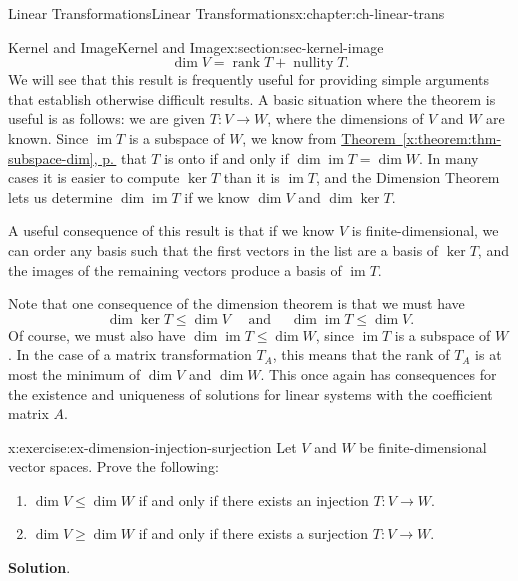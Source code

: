 \documentclass[oneside,10pt,]{book}
\newcommand{\blocktitlefont}{\relax}
\newcommand{\xreffont}{\relax}
\numberwithin{equation}{section}
\newcommand{\im}{\operatorname{im}}
\newcommand{\rank}{\operatorname{rank}}
\begin{document}
\begin{chapterptx}{Linear Transformations}{}{Linear Transformations}{}{}{x:chapter:ch-linear-trans}
\begin{sectionptx}{Kernel and Image}{}{Kernel and Image}{}{}{x:section:sec-kernel-image}
\begin{equation*}
\dim V = \rank T + \operatorname{nullity} T\text{.}
\end{equation*}
We will see that this result is frequently useful for providing simple arguments that establish otherwise difficult results. A basic situation where the theorem is useful is as follows: we are given \(T:V\to W\), where the dimensions of \(V\) and \(W\) are known. Since \(\im T\) is a subspace of \(W\), we know from \hyperref[x:theorem:thm-subspace-dim]{Theorem~{\xreffont\ref{x:theorem:thm-subspace-dim}}, p.\,\pageref{x:theorem:thm-subspace-dim}} that \(T\) is onto if and only if \(\dim \im T = \dim W\). In many cases it is easier to compute \(\ker T\) than it is \(\im T\), and the Dimension Theorem lets us determine \(\dim\im T\) if we know \(\dim V\) and \(\dim \ker T\).%
\par
A useful consequence of this result is that if we know \(V\) is finite-dimensional, we can order any basis such that the first vectors in the list are a basis of \(\ker T\), and the images of the remaining vectors produce a basis of \(\im T\).%
\par
Note that one consequence of the dimension theorem is that we must have%
\begin{equation*}
\dim \ker T\leq \dim V \quad \text{ and } \quad \dim \im T\leq \dim V\text{.}
\end{equation*}
Of course, we must also have \(\dim\im T\leq \dim W\), since \(\im T\) is a subspace of \(W\). In the case of a matrix transformation \(T_A\), this means that the rank of \(T_A\) is at most the minimum of \(\dim V\) and \(\dim W\). This once again has consequences for the existence and uniqueness of solutions for linear systems with the coefficient matrix \(A\).%
\begin{inlineexercise}{}{x:exercise:ex-dimension-injection-surjection}%
Let \(V\) and \(W\) be finite-dimensional vector spaces. Prove the following:%
\begin{enumerate}
\item{}\(\dim V\leq \dim W\) if and only if there exists an injection \(T:V\to W\).%
\item{}\(\dim V\geq \dim W\) if and only if there exists a surjection \(T:V\to W\).%
\end{enumerate}
%
\par\smallskip%
\noindent\textbf{\blocktitlefont Solution}.\label{g:solution:idm45936166348256}{}\hypertarget{g:solution:idm45936166348256}{}\quad{}%
\begin{enumerate}

\end{enumerate}
\end{inlineexercise}
\end{sectionptx}
\end{chapterptx}
\end{document}

